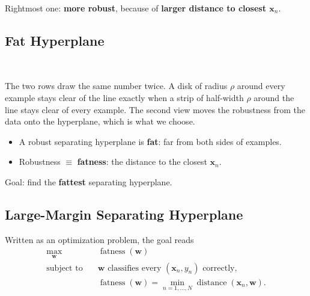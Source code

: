 \begin{moral}
    Rightmost one: \textbf{more robust}, because of \textbf{larger distance
    to closest \(\bm{x}_n\)}.
\end{moral}

\subsection{Fat Hyperplane}

\begin{center}
    \quad
    \quad
    \\[6pt]
    \quad
    \quad
\end{center}

The two rows draw the same number twice. A disk of radius \(\rho\) around
every example stays clear of the line exactly when a strip of half-width
\(\rho\) around the line stays clear of every example. The second view moves
the robustness from the data onto the hyperplane, which is what we choose.
\begin{itemize}
    \item A robust separating hyperplane is \textbf{fat}: far from both sides
        of examples.
    \item Robustness \(\equiv\) \textbf{fatness}: the distance to the closest
        \(\bm{x}_n\).
\end{itemize}

\begin{moral}
    Goal: find the \textbf{fattest} separating hyperplane.
\end{moral}

\subsection{Large-Margin Separating Hyperplane}

\begin{center}
    \quad
    \quad
\end{center}

Written as an optimization problem, the goal reads
\[
    \begin{aligned}
        \max_{\bm{w}} \quad & \operatorname{fatness}(\bm{w})\\
        \text{subject to} \quad & \bm{w} \text{ classifies every }
            (\bm{x}_n, y_n) \text{ correctly},\\
        & \operatorname{fatness}(\bm{w}) = \min_{n=1,\dots,N}
            \operatorname{distance}(\bm{x}_n, \bm{w}).
    \end{aligned}
\]

